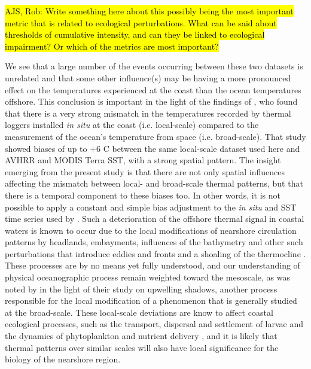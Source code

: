 \documentclass[a4paper,10pt,review]{elsarticle}
\begin{document}
\hl{AJS, Rob: Write something here about this possibly being the most important metric that is related to ecological perturbations. What can be said about thresholds of cumulative intensity, and can they be linked to ecological impairment? Or which of the metrics are most important?}

We see that a large number of the events occurring between these two datasets is unrelated and that some other influence(s) may be having a more pronounced effect on the temperatures experienced at the coast than the ocean temperatures offshore. This conclusion is important in the light of the findings of \citet{Smit2013}, who found that there is a very strong mismatch in the temperatures recorded by thermal loggers installed \emph{in situ} at the coast (i.e. local-scale) compared to the measurement of the ocean's temperature from space (i.e. broad-scale). That study showed biases of up to +6 \degree C between the same local-scale dataset used here and AVHRR and MODIS Terra SST, with a strong spatial pattern. The insight emerging from the present study is that there are not only spatial influences affecting the mismatch between local- and broad-scale thermal patterns, but that there is a temporal component to these biases too. In other words, it is not possible to apply a constant and simple bias adjustment to the \emph{in situ} and SST time series used by \citet{Smit2013}. Such a deterioration of the offshore thermal signal in coastal waters is known to occur due to the local modifications of nearshore circulation patterns by headlands, embayments, influences of the bathymetry and other such perturbations that introduce eddies and fronts and a shoaling of the thermocline \citep{Okubo1973, Pingree1979, Wolanski1988, Black1990, Grundlingh1991, Graham1997}. These processes are by no means yet fully understood, and our understanding of physical oceanographic process remain weighted toward the mesoscale, as was noted by \citet{Graham1997} in the light of their study on upwelling shadows, another process responsible for the local modification of a phenomenon that is generally studied at the broad-scale. These local-scale deviations are know to affect coastal ecological processes, such as the transport, dispersal and settlement of larvae \citep{Pineda:1994kc,McCulloch:2003de,Narvaez:2004ix} and the dynamics of phytoplankton and nutrient delivery \citep{Graham1997,Narvaez:2004ix}, and it is likely that thermal patterns over similar scales will also have local significance for the biology of the nearshore region.
\end{document}
